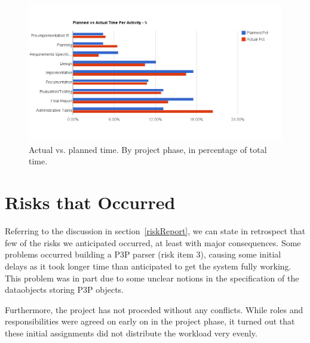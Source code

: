 \begin{centering}
  \begin{figure}[h!]
    \includegraphics[width=\textwidth]{Evaluation/time_per_activity_pct}
    \caption{Actual vs. planned time. By project phase, in percentage of total time.}
    \label{perActivityCUml}
  \end{figure}
\end{centering}

\section{Risks that Occurred}

Referring to the discussion in section~\ref{riskReport}, we can state
in retrospect that few of the risks we anticipated occurred, at least
with major consequences. Some problems occurred building a P3P
parser (risk item 3), causing some initial delays as it took longer time than
anticipated to get the system fully working. This problem was in part
due to some unclear notions in the specification of the dataobjects
storing P3P objects.

Furthermore, the project has not proceded without any conflicts. While
roles and responsibilities were agreed on early on in the project
phase, it turned out that these initial assignments did not distribute the
workload very evenly. 
